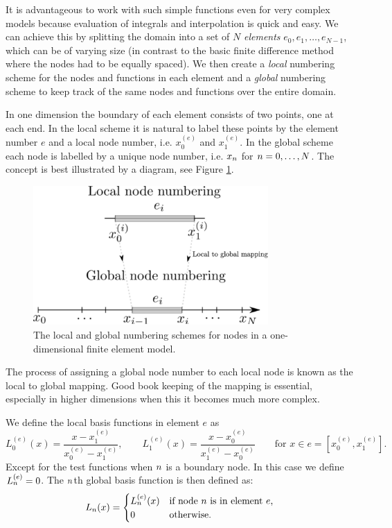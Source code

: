 It is advantageous to work with such simple functions even for very complex
models because evaluation of integrals and interpolation is quick and easy. We
can achieve this by splitting the domain into a set of $N$ \emph{elements}
$e_{0},e_{1},\ldots,e_{N-1}$, which can be of varying size (in contrast to the
basic finite difference method where the nodes had to be equally spaced). We
then create a \emph{local} numbering scheme for the nodes and functions in each
element and a \emph{global} numbering scheme to keep track of the same nodes and
functions over the entire domain.

In one dimension the boundary of each element consists of two points, one at
each end. In the local scheme it is natural to label these points by the element
number $e$ and a local node number, i.e. $x_{0}^{(e)}$ and $x_{1}^{(e)}$. In the
global scheme each node is labelled by a unique node number, i.e. $x_{n}$ for
$n=0,\ldots,N$. The concept is best illustrated by a diagram, see Figure
\ref{fig:local-global-numbering}.

\begin{figure}[ht]
  \center
  \includegraphics[width=0.8\textwidth]{./images/local_global_numbering}
  \caption{The local and global numbering schemes for nodes in a one-dimensional
    finite element model.}
  \label{fig:local-global-numbering}
\end{figure}

The process of assigning a global node number to each local node is known as the
local to global mapping. Good book keeping of the mapping is essential,
especially in higher dimensions when this it becomes much more complex.

We define the local basis functions in element $e$ as
\begin{equation}
  L_{0}^{(e)}(x)=\dfrac{x-x_{1}^{(e)}}{x_{0}^{(e)}-x_{1}^{(e)}},\qquad
  L_{1}^{(e)}(x)=\dfrac{x-x_{0}^{(e)}}{x_{1}^{(e)}-x_{0}^{(e)}}
  \qquad\text{for }x\in e=[x_{0}^{(e)},x_{1}^{(e)}].
  \label{eq:32}
\end{equation}
Except for the test functions when $n$ is a boundary node. In this case we define $L_n^{(e)} = 0$.
The $n$th global basis function is then defined as:
\begin{equation}
  \label{eq:33}
  L_n(x) =
  \begin{cases}
    L_n^{(e)}(x) & \text{if node $n$ is in element $e$,} \\
    0 & \text{otherwise.}
  \end{cases}
\end{equation}

